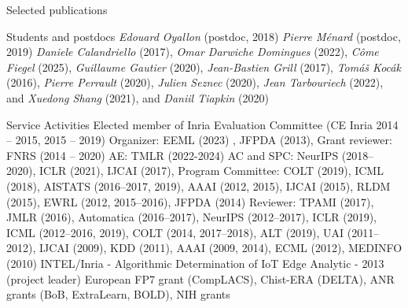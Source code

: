 \documentclass{resume}
\begin{document}
\begin{category}{Selected publications}



  

\end{category}
\vspace{-0.5cm}
\begin{category}{Students and postdocs}
\citemnobullet 
\textit{Edouard Oyallon} (postdoc, 2018)
\textit{Pierre M\'enard} (postdoc, 2019)
\textit{Daniele Calandriello} (2017), 
\textit{Omar Darwiche Domingues} (2022), 
\textit{C\^{o}me Fiegel} (2025),
\textit{Guillaume Gautier} (2020),
\textit{Jean-Bastien Grill} (2017), 
\textit{Tom\'a\v s Koc\' ak} (2016),
\textit{Pierre Perrault} (2020), 
\textit{Julien Seznec} (2020), 
\textit{Jean Tarbouriech} (2022), and
\textit{Xuedong Shang} (2021), and 
\textit{Daniil Tiapkin} (2020) 

\end{category}
\vspace{-0.5cm}
\begin{category}{Service Activities}
\setlength\itemsep{0.15em}
\citembullet Elected member of Inria Evaluation Committee (CE Inria 2014 -- 2015, 2015 -- 2019)
\citembullet Organizer: EEML (2023) , JFPDA (2013),  Grant reviewer: FNRS (2014 -- 2020)
\citembullet AE: TMLR (2022-2024) AC and SPC: NeurIPS (2018--2020), ICLR (2021),  IJCAI (2017), Program Committee: COLT (2019), ICML (2018), AISTATS (2016--2017, 2019), AAAI (2012, 2015), IJCAI (2015), RLDM (2015), EWRL 
(2012, 2015--2016), JFPDA (2014)
\citembullet  Reviewer: TPAMI (2017), JMLR (2016), Automatica (2016--2017), NeurIPS (2012--2017), ICLR (2019), ICML (2012--2016, 2019), COLT
(2014, 2017--2018), ALT (2019), UAI (2011--2012), IJCAI (2009), KDD (2011), AAAI (2009, 2014), ECML
(2012), MEDINFO (2010)
\citembullet INTEL/Inria - Algorithmic Determination of IoT Edge Analytic -
2013 (project leader)
\citembullet  European FP7 grant (CompLACS), Chist-ERA (DELTA), ANR grants (BoB, ExtraLearn, BOLD), NIH grants
\end{category}
\end{document}
